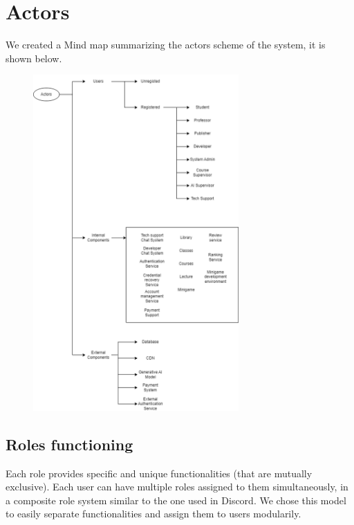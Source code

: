 \section{Actors} \label{actors}
We created a Mind map summarizing the actors scheme of the system, it is shown below.
\begin{figure}[h]
	\centering
	\includegraphics[width=0.7\textwidth]{images/RadiantIQ-actors.png}
\end{figure}

\subsection{Roles functioning}
Each role provides specific and unique functionalities (that are mutually exclusive). Each user can have multiple roles assigned to them simultaneously, in a composite role system similar to the one used in Discord. We chose this model to easily separate functionalities and assign them to users modularily.

